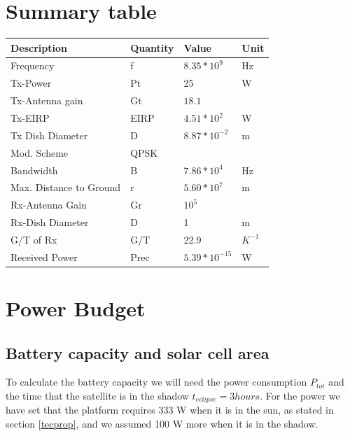 \documentclass[a4paper,12pt,calibri,oneside,openany]{book}
\theoremstyle{break}
\begin{document}
	\section{Summary table}	

		\begin{center}
			\begin{tabular}{ | l | l | l | p{1.5cm} |}
				\hline
				Description & Quantity & Value & Unit \\ \hline
				Frequency & f  & $8.35*10^{9}$ & Hz \\ \hline
				Tx-Power & Pt & 25 & W
				\\ \hline
				Tx-Antenna gain & Gt & $18.1$ & 
				\\ \hline
				Tx-EIRP & EIRP & $4.51*10^{2}$ & W
				\\ \hline
				Tx Dish Diameter & D & $8.87*10^{-2}$ & m
				\\ \hline
				Mod. Scheme & QPSK &  & 
				\\ \hline
				Bandwidth & B & $7.86*10^{4}$ & Hz
				\\ \hline
				Max. Distance to Ground & r & $5.60*10^{7}$ & m
				\\ \hline
				Rx-Antenna Gain & Gr & $10^{5}$ & 
				\\ \hline
				Rx-Dish Diameter & D & 1 & m
				\\ \hline
				G/T of Rx & G/T & 22.9 & $K^{-1}$
				\\ \hline
				Received Power & Prec & $5.39*10^{-15}$ & W
				\\ \hline
				
						\end{tabular}
					\end{center}
				
\newpage
\section{Power Budget}
	\subsection{Battery capacity and solar cell area}
	
		To calculate the battery capacity we will need the power consumption $P_{tot}$ and the time that the satellite is in the shadow $t_{eclipse} = 3 hours$. For the power we have set that the platform requires 333 W when it is in the sun, as stated in section \ref{tecprop}, and we assumed 100 W more when it is in the shadow.
		
\end{document}
